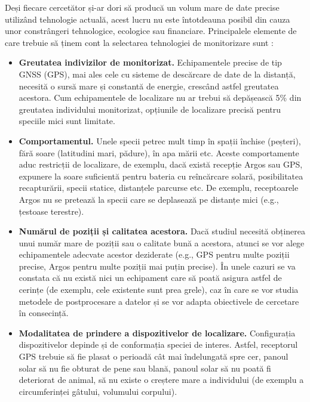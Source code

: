 \documentclass[11pt,onehalfspacing]{elife}
\begin{document}
Deși fiecare cercetător și-ar dori să producă un volum mare de date precise utilizând tehnologie actuală, acest lucru nu este întotdeauna posibil din cauza unor constrângeri tehnologice, ecologice sau financiare. Principalele elemente de care trebuie să ținem cont la selectarea tehnologiei de monitorizare sunt \citep{Silvy2012, Thomas2012}:
\begin{itemize}
 \item \textbf{Greutatea indivizilor de monitorizat.} Echipamentele precise de tip GNSS (GPS), mai ales cele cu sisteme de descărcare de date de la distanță, necesită o sursă mare și constantă de energie, crescând astfel greutatea acestora. Cum echipamentele de localizare nu ar trebui să depășească 5\% din greutatea individului monitorizat, opțiunile de localizare precisă pentru speciile mici sunt limitate.\\
 \item \textbf{Comportamentul.} Unele specii petrec mult timp în spații închise (peșteri), fără soare (latitudini mari, pădure), în apa mării etc. Aceste comportamente aduc restricții de localizare, de exemplu, dacă există recepție Argos sau GPS, expunere la soare suficientă pentru bateria cu reîncărcare solară, posibilitatea recapturării, specii statice, distanțele parcurse etc. De exemplu, receptoarele Argos nu se pretează la specii care se deplasează pe distanțe mici (e.g., țestoase terestre).\\
\item \textbf{Numărul de poziții și calitatea acestora.} Dacă studiul necesită obținerea unui număr mare de poziții sau o calitate bună a acestora, atunci se vor alege echipamentele adecvate acestor deziderate (e.g., GPS pentru multe poziții precise, Argos pentru multe poziții mai puțin precise). În unele cazuri se va constata că nu există nici un echipament care să poată asigura astfel de cerințe (de exemplu, cele existente sunt prea grele), caz în care se vor studia metodele de postprocesare a datelor și se vor adapta obiectivele de cercetare în consecință.\\
 \item \textbf{Modalitatea de prindere a dispozitivelor de localizare.} Configurația dispozitivelor depinde și de conformația speciei de interes. Astfel, receptorul GPS trebuie să fie plasat o perioadă cât mai îndelungată spre cer, panoul solar să nu fie obturat de pene sau blană, panoul solar să nu poată fi deteriorat de animal, să nu existe o creștere mare a individului (de exemplu a circumferinței gâtului, volumului corpului).\\

\end{itemize}
\end{document}
